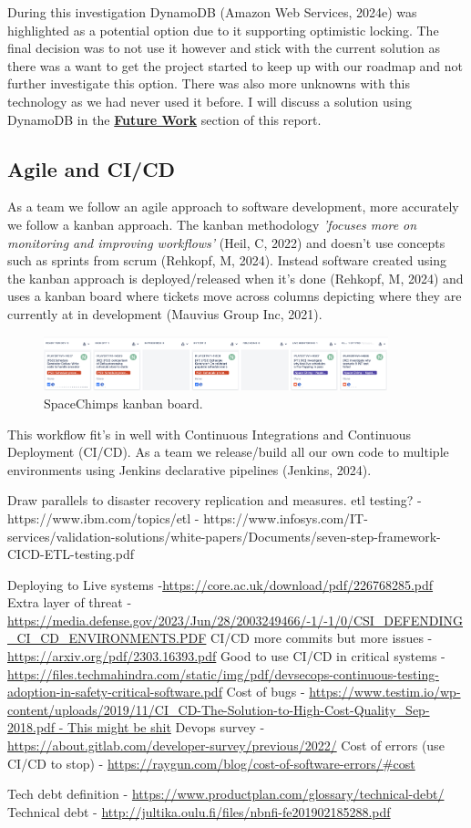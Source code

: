   During this investigation DynamoDB (Amazon Web Services, 2024e) was highlighted as a potential option due to it supporting optimistic
  locking. The final decision was to not use it however and stick with the current solution as there was a want to get the project started to keep 
  up with our roadmap and not further investigate this option. There was also more unknowns with this technology as we had never used it before.
  I will discuss a solution using DynamoDB in the \hyperref[sec:future]{\textbf{Future Work}} section of this report.
   
  \subsection{Agile and CI/CD}
  As a team we follow an agile approach to software development, more accurately we follow a kanban approach. The kanban methodology 
  \textit{'focuses more on monitoring and improving workflows'} (Heil, C, 2022) and doesn't use concepts such as sprints from scrum (Rehkopf, M, 2024). 
  Instead software created using the kanban approach is deployed/released when it's done (Rehkopf, M, 2024) and uses a kanban board where tickets move 
  across columns depicting where they are currently at in development (Mauvius Group Inc, 2021).

  \begin{figure}[H]
    \centering
    \includegraphics[width=10cm]{assets/kanbanBoard.png}
    \caption{SpaceChimps kanban board.}
    \label{fig:kanbanBoard}
  \end{figure}

  This workflow fit's in well with Continuous Integrations and Continuous Deployment (CI/CD). As a team we release/build all our own code to 
  multiple environments using Jenkins declarative pipelines (Jenkins, 2024).

  

  Draw parallels to disaster recovery replication and measures.
  etl testing? 
   - https://www.ibm.com/topics/etl
   - https://www.infosys.com/IT-services/validation-solutions/white-papers/Documents/seven-step-framework-CICD-ETL-testing.pdf

  Deploying to Live systems -\url{https://core.ac.uk/download/pdf/226768285.pdf}
  Extra layer of threat - \url{https://media.defense.gov/2023/Jun/28/2003249466/-1/-1/0/CSI_DEFENDING_CI_CD_ENVIRONMENTS.PDF}
  CI/CD more commits but more issues - \url{https://arxiv.org/pdf/2303.16393.pdf}
  Good to use CI/CD in critical systems - \url{https://files.techmahindra.com/static/img/pdf/devsecops-continuous-testing-adoption-in-safety-critical-software.pdf}
  Cost of bugs - \url{https://www.testim.io/wp-content/uploads/2019/11/CI_CD-The-Solution-to-High-Cost-Quality_Sep-2018.pdf - This might be shit}
  Devops survey - \url{https://about.gitlab.com/developer-survey/previous/2022/}
  Cost of errors (use CI/CD to stop) - \url{https://raygun.com/blog/cost-of-software-errors/#cost}

  Tech debt definition - \url{https://www.productplan.com/glossary/technical-debt/}
  Technical debt - \url{http://jultika.oulu.fi/files/nbnfi-fe201902185288.pdf}

\newpage